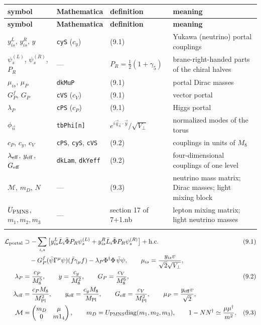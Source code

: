 \documentclass[10pt,a4paper]{article}
\begin{document}
{\footnotesize
\begin{longtable}{>{\raggedright\arraybackslash}p{}>{\raggedright\arraybackslash}p{}>{\raggedright\arraybackslash}p{}>{\raggedright\arraybackslash}p{}}
\toprule
\textbf{symbol} & \textbf{Mathematica} & \textbf{definition} & \textbf{meaning} \\
\midrule\endfirsthead
\toprule
\textbf{symbol} & \textbf{Mathematica} & \textbf{definition} & \textbf{meaning} \\
\midrule\endhead
\endfoot
\bottomrule\endlastfoot
$y^L_{is}$, $y^R_{is}$, $y$ & \texttt{cyS} ($c_y$) & (9.1) & Yukawa (neutrino) portal couplings \\
$\psi^{(L)}_s$, $\psi^{(R)}_s$, $P_R$ & — & $P_R=\frac12(1+\gamma_5)$ & brane-right-handed parts of the chiral halves \\
$\mu_{is}$, $\mu_P$ & \texttt{dkMuP} & (9.1) & portal Dirac masses \\
$G^f_P$, $G_P$ & \texttt{cVS} ($c_V$) & (9.1) & vector portal \\
$\lambda_P$ & \texttt{cPS} ($c_P$) & (9.1) & Higgs portal \\
$\phi_{\vec n}$ & \texttt{tbPhi[n]} & $e^{i\vec q_{\vec n}\cdot\vec y}/\sqrt{V_\perp}$ & normalized modes of the torus \\
$c_P$, $c_y$, $c_V$ & \texttt{cPS}, \texttt{cyS}, \texttt{cVS} & (9.2) & couplings in units of $M_8$ \\
$\lambda_{\rm eff}$, $y_{\rm eff}$, $G_{\rm eff}$ & \texttt{dkLam}, \texttt{dkYeff} & (9.2) & four-dimensional couplings of one level \\
$\mathcal M$, $m_D$, $N$ & — & (9.3) & neutrino mass matrix; Dirac masses; light mixing block \\
$U_{\rm PMNS}$, $m_1,m_2,m_3$ & — & section 17 of 7+1.nb & lepton mixing matrix; light neutrino masses \\*
\end{longtable}}
\begin{align*}
\mathcal L_{\rm portal}&\supset-\sum_{i,s}\big[y^L_{is}\bar L_i\tilde\Phi P_R\psi^{(L)}_s+y^R_{is}\bar L_i\tilde\Phi P_R\psi^{(R)}_s\big]+\text{h.c.}&&(9.1) \\
&\quad-G^f_P(\bar\psi\Gamma^\mu\psi)(\bar f\gamma_\mu f)-\lambda_P\Phi^\dagger\Phi\,\bar\psi\psi,\qquad \mu_{is}=\frac{y_{is}v}{\sqrt2\sqrt{V_\perp}}, \\
\lambda_P&=\frac{c_P}{M_8^5},\qquad y=\frac{c_y}{M_8^2},\qquad G_P=\frac{c_V}{M_8^6},&&(9.2) \\
\lambda_{\rm eff}&=\frac{c_PM_8}{M_{\rm Pl}^2},\qquad y_{\rm eff}=\frac{c_yM_8}{M_{\rm Pl}},\qquad G_{\rm eff}=\frac{c_V}{M_{\rm Pl}^2},\qquad \mu_P=\frac{y_{\rm eff}v}{\sqrt2}, \\
\mathcal M&=\begin{pmatrix}m_D&\mu\\0&m1_4\end{pmatrix},\qquad m_D=U_{\rm PMNS}\mathrm{diag}(m_1,m_2,m_3),\qquad 1-NN^\dagger\simeq\frac{\mu\mu^\dagger}{m^2}.&&(9.3)
\end{align*}
\end{document}
